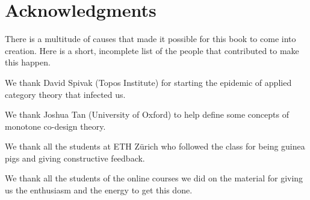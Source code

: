 
\section{Acknowledgments}

There is a multitude of causes that made it possible for this book to come into creation.
Here is a short, incomplete list of the people that contributed to make this happen.

We thank David Spivak (Topos Institute) for starting the epidemic of applied category theory that infected us.

We thank Joshua Tan (University of Oxford) to help define some concepts of monotone co-design theory.

We thank all the students at ETH Zürich who followed the class for being guinea pigs and giving constructive feedback.

We thank all the students of the online courses we did on the material for giving us the enthusiasm and the energy to get this done.


\begin{comment}
An incomplete list of students to thank for their feedback: Linus Schoch

\end{comment}

